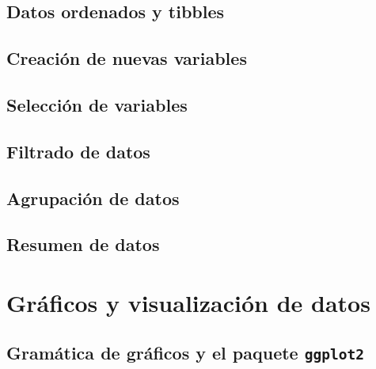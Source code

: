 \documentclass[
]{book}
\theoremstyle{definition}
\theoremstyle{definition}
\theoremstyle{definition}
\theoremstyle{definition}
\theoremstyle{remark}
\begin{document}
\hypertarget{datos-ordenados-y-tibbles}{%
\section{Datos ordenados y tibbles}\label{datos-ordenados-y-tibbles}}

\hypertarget{creaciuxf3n-de-nuevas-variables}{%
\section{Creación de nuevas variables}\label{creaciuxf3n-de-nuevas-variables}}

\hypertarget{selecciuxf3n-de-variables}{%
\section{Selección de variables}\label{selecciuxf3n-de-variables}}

\hypertarget{filtrado-de-datos}{%
\section{Filtrado de datos}\label{filtrado-de-datos}}

\hypertarget{agrupaciuxf3n-de-datos}{%
\section{Agrupación de datos}\label{agrupaciuxf3n-de-datos}}

\hypertarget{resumen-de-datos}{%
\section{Resumen de datos}\label{resumen-de-datos}}

\hypertarget{gruxe1ficos-y-visualizaciuxf3n-de-datos}{%
\chapter{Gráficos y visualización de datos}\label{gruxe1ficos-y-visualizaciuxf3n-de-datos}}

\hypertarget{gramuxe1tica-de-gruxe1ficos-y-el-paquete-ggplot2}{%
\section{\texorpdfstring{Gramática de gráficos y el paquete \texttt{ggplot2}}{Gramática de gráficos y el paquete ggplot2}}\label{gramuxe1tica-de-gruxe1ficos-y-el-paquete-ggplot2}}
\end{document}
